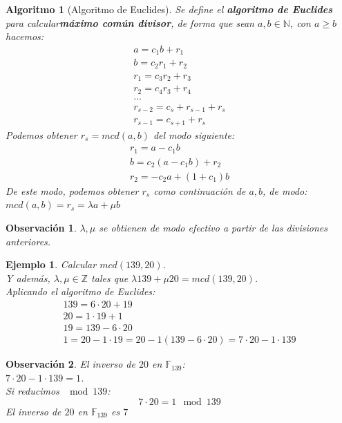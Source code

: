 \documentclass[spanish]{book}
\newtheorem{alg}{Algoritmo}
\newtheorem{ejem}{Ejemplo}
\newtheorem{obsv}{Observación}
\begin{document}
\begin{alg}[Algoritmo de Euclides]
	Se define el \textbf{algoritmo de Euclides} para calcular\textbf{máximo común divisor}, de forma que sean $a, b \in \mathbb{N}$, con $a \geq b$ hacemos:
	\begin{eqnarray}
		a=c_1 b + r_1 \nonumber \\
		b=c_2 r_1 + r_2 \nonumber \\
		r_1=c_3 r_2 +  r_3 \nonumber \\
		r_2 = c_4 r_3 + r_4 \nonumber \\
		... \nonumber \\
		r_{s-2}=c_s+r_{s-1}+r_s \nonumber \\
		r_{s-1}=c_{s+1}+r_s \nonumber 
	\end{eqnarray}
	Podemos obtener $r_s=mcd(a, b)$ del modo siguiente: 
	\begin{eqnarray}
		r_1=a-c_1b \nonumber \\
		b = c_2(a-c_1b) + r_2  \nonumber \\
		r_2 = -c_2 a + (1+c_1)b \nonumber
	\end{eqnarray}
	De este modo, podemos obtener $r_s$ como continuación de $a, b$, de modo: \\
	$mcd(a, b)=r_s=\lambda a + \mu b$
\end{alg}

\begin{obsv}
	$\lambda, \mu$ se obtienen de modo efectivo a partir de las divisiones anteriores.
\end{obsv}

\begin{ejem}
	Calcular $mcd(139, 20)$. \\
	Y además, $\lambda, \mu \in \mathbb{Z}$ tales que $\lambda 139 + \mu 20  = mcd(139, 20)$. \\
	Aplicando el algoritmo de Euclides:
	\begin{eqnarray}
		139=6 \cdot 20+19 \nonumber \\
		20=1 \cdot 19 + 1 \nonumber \\
		19=139-6\cdot 20 \nonumber \\
		1 = 20 - 1 \cdot 19=20-1(139-6\cdot 20)=7\cdot 20 - 1 \cdot 139 \nonumber
	\end{eqnarray}
\end{ejem}

\begin{obsv}
	El inverso de $20$ en $\mathbb{F}_{139}$: \\
	$7 \cdot 20 - 1 \cdot 139 = 1$. \\
	Si reducimos $\mod 139$: \\
	\begin{equation*}
	7\cdot 20 = 1 \mod 139
	\end{equation*}
	El inverso de $20$ en $\mathbb{F}_{139}$ es $7$
\end{obsv}
\end{document}
